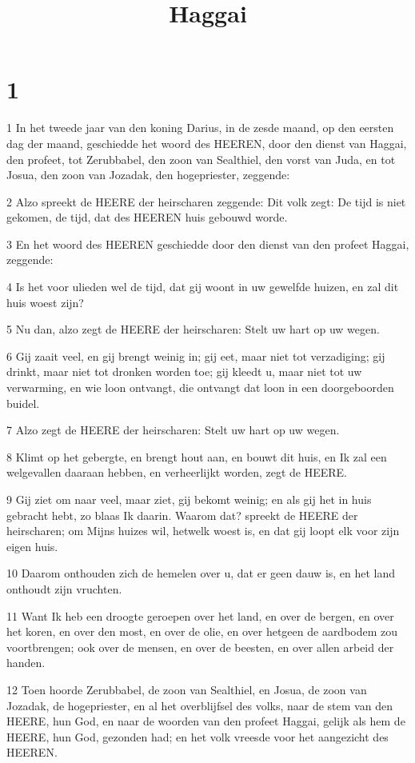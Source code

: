 

\title{Haggai}



\chapter{1}

\par 1 In het tweede jaar van den koning Darius, in de zesde maand, op den eersten dag der maand, geschiedde het woord des HEEREN, door den dienst van Haggai, den profeet, tot Zerubbabel, den zoon van Sealthiel, den vorst van Juda, en tot Josua, den zoon van Jozadak, den hogepriester, zeggende:
\par 2 Alzo spreekt de HEERE der heirscharen zeggende: Dit volk zegt: De tijd is niet gekomen, de tijd, dat des HEEREN huis gebouwd worde.
\par 3 En het woord des HEEREN geschiedde door den dienst van den profeet Haggai, zeggende:
\par 4 Is het voor ulieden wel de tijd, dat gij woont in uw gewelfde huizen, en zal dit huis woest zijn?
\par 5 Nu dan, alzo zegt de HEERE der heirscharen: Stelt uw hart op uw wegen.
\par 6 Gij zaait veel, en gij brengt weinig in; gij eet, maar niet tot verzadiging; gij drinkt, maar niet tot dronken worden toe; gij kleedt u, maar niet tot uw verwarming, en wie loon ontvangt, die ontvangt dat loon in een doorgeboorden buidel.
\par 7 Alzo zegt de HEERE der heirscharen: Stelt uw hart op uw wegen.
\par 8 Klimt op het gebergte, en brengt hout aan, en bouwt dit huis, en Ik zal een welgevallen daaraan hebben, en verheerlijkt worden, zegt de HEERE.
\par 9 Gij ziet om naar veel, maar ziet, gij bekomt weinig; en als gij het in huis gebracht hebt, zo blaas Ik daarin. Waarom dat? spreekt de HEERE der heirscharen; om Mijns huizes wil, hetwelk woest is, en dat gij loopt elk voor zijn eigen huis.
\par 10 Daarom onthouden zich de hemelen over u, dat er geen dauw is, en het land onthoudt zijn vruchten.
\par 11 Want Ik heb een droogte geroepen over het land, en over de bergen, en over het koren, en over den most, en over de olie, en over hetgeen de aardbodem zou voortbrengen; ook over de mensen, en over de beesten, en over allen arbeid der handen.
\par 12 Toen hoorde Zerubbabel, de zoon van Sealthiel, en Josua, de zoon van Jozadak, de hogepriester, en al het overblijfsel des volks, naar de stem van den HEERE, hun God, en naar de woorden van den profeet Haggai, gelijk als hem de HEERE, hun God, gezonden had; en het volk vreesde voor het aangezicht des HEEREN.
